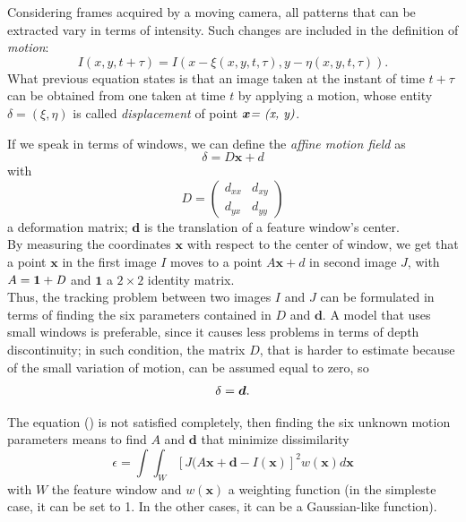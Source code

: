 \documentclass[a4paper, onecolumn]{report}
\begin{document}
Considering frames acquired by a moving camera, all patterns that can be extracted vary in terms of intensity. Such changes are included in the definition of \emph{motion}:
\begin{equation}
	I(x, y, t+\tau) = I(x-\xi(x,y,t,\tau), y - \eta(x,y,t,\tau)).
\end{equation}
What previous equation states is that an image taken at the instant of time $t+\tau$ can be obtained from one taken at time $t$ by applying a motion, whose entity $\delta = (\xi, \eta)$ is called \emph{displacement} of point $\boldsymbol{x}\emph{= (x, y)}$.

If we speak in terms of windows, we can define the \emph{affine motion field} as 
\begin{equation}
	\delta = D\boldsymbol{x} + d
\end{equation}
with
\begin{equation}
	D = \left(\begin{matrix}d_{xx} & d_{xy} \\ d_{yx} & d_{yy}\end{matrix}\right)
\end{equation}
a deformation matrix; $\boldsymbol{d}$ is the translation of a feature window's center. \\ 
By measuring the coordinates $\boldsymbol{x}$ with respect to the center of window, we get that a point $\boldsymbol{x}$ in the first image $I$ moves to a point $A\boldsymbol{x} + d$ in second image $J$, with $A=\boldsymbol{1} + \emph{D}$ and $\boldsymbol{1}$ a $2 \times 2$ identity matrix. \\
Thus, the tracking problem between two images $I$ and $J$ can be formulated in terms of finding the six parameters contained in $D$ and $\boldsymbol{d}$. A model that uses small windows is preferable, since it causes less problems in terms of depth discontinuity; in such condition, the matrix $D$, that is harder to estimate because of the small variation of motion, can be assumed equal to zero, so
\begin{equation}
	\delta = \boldsymbol{d}. \notag
\end{equation}

The equation () is not satisfied completely, then finding the six unknown motion parameters means to find $A$ and $\boldsymbol{d}$ that minimize dissimilarity
\begin{equation}
	\epsilon = \int \int_W [J(A\boldsymbol{x} + \boldsymbol{d} - I(\boldsymbol{x})]^2 w(\boldsymbol{x})d\boldsymbol{x}
\end{equation}
with $W$ the feature window and $w(\boldsymbol{x})$ a weighting function (in the simpleste case, it can be set to 1. In the other cases, it can be a Gaussian-like function).
\end{document}
